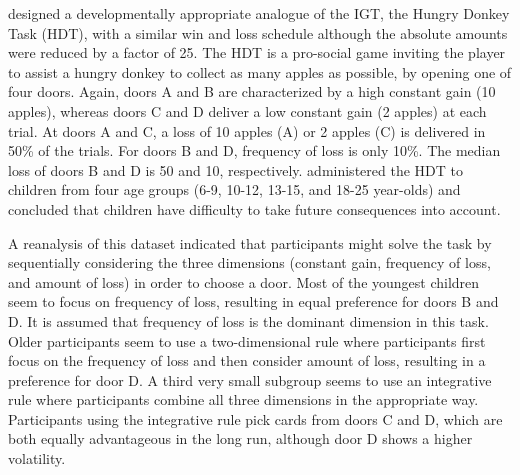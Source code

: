 \documentclass[a4paper,12pt,man]{apa} %
\newcommand{\citet}{\citeA}
\begin{document}
\citet{Crone2004} designed a developmentally appropriate analogue of
the IGT, the Hungry Donkey Task (HDT), with a similar win and loss
schedule although the absolute amounts were reduced by a factor of 25.
The HDT is a pro-social game inviting the player to assist a hungry
donkey to collect as many apples as possible, by opening one of four
doors.  Again, doors A and B are characterized by a high constant gain
(10 apples), whereas doors C and D deliver a low constant gain (2
apples) at each trial.  At doors A and C, a loss of 10 apples (A) or 2
apples (C) is delivered in 50\% of the trials.  For doors B and D,
frequency of loss is only 10\%.  The median loss of doors B and D is
50 and 10, respectively.  \citet{Crone2004} administered the HDT to
children from four age groups (6-9, 10-12, 13-15, and 18-25 year-olds)
and concluded that children have difficulty to take future
consequences into account.

A reanalysis of this dataset \cite{Huizenga2007b} indicated that
participants might solve the task by sequentially considering the
three dimensions (constant gain, frequency of loss, and amount of
loss) in order to choose a door.  Most of the youngest children seem
to focus on frequency of loss, resulting in equal preference for doors
B and D. It is assumed that frequency of loss is the dominant
dimension in this task.  Older participants seem to use a
two-dimensional rule where participants first focus on the frequency
of loss and then consider amount of loss, resulting in a preference
for door D. A third very small subgroup seems to use an integrative
rule where participants combine all three dimensions in the
appropriate way.  Participants using the integrative rule pick cards
from doors C and D, which are both equally advantageous in the long
run, although door D shows a higher volatility. 

\end{document}
